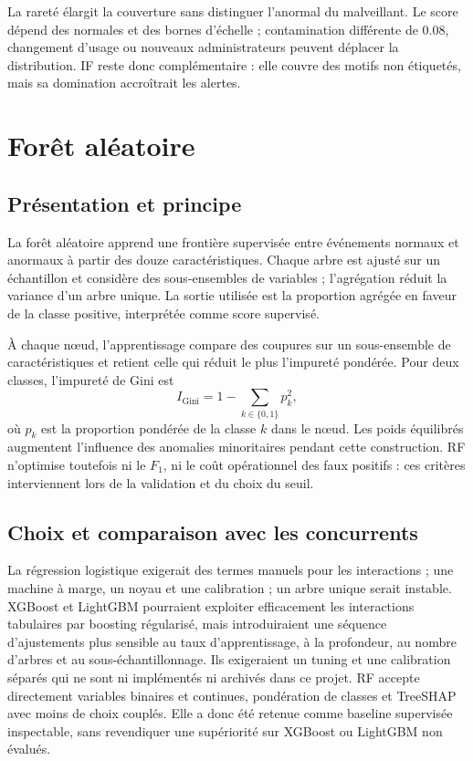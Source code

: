 \documentclass[11pt,a4paper,oneside]{report}
\theoremstyle{definition}
\theoremstyle{plain}
\begin{document}
La rareté élargit la couverture sans distinguer l'anormal du malveillant. Le score dépend des normales et des bornes d'échelle ; contamination différente de $0.08$, changement d'usage ou nouveaux administrateurs peuvent déplacer la distribution. IF reste donc complémentaire : elle couvre des motifs non étiquetés, mais sa domination accroîtrait les alertes.

\section{Forêt aléatoire}
\label{sec:ai-ro-rf}

\subsection*{Présentation et principe}

La forêt aléatoire apprend une frontière supervisée entre événements normaux et anormaux à partir des douze caractéristiques. Chaque arbre est ajusté sur un échantillon et considère des sous-ensembles de variables ; l'agrégation réduit la variance d'un arbre unique. La sortie utilisée est la proportion agrégée en faveur de la classe positive, interprétée comme score supervisé.

À chaque nœud, l'apprentissage compare des coupures sur un sous-ensemble de
caractéristiques et retient celle qui réduit le plus l'impureté pondérée. Pour
deux classes, l'impureté de Gini est
\[
I_{\mathrm{Gini}}=1-\sum_{k\in\{0,1\}}p_k^2,
\]
où $p_k$ est la proportion pondérée de la classe $k$ dans le nœud. Les poids
équilibrés augmentent l'influence des anomalies minoritaires pendant cette
construction. RF n'optimise toutefois ni le $F_1$, ni le coût opérationnel des
faux positifs : ces critères interviennent lors de la validation et du choix
du seuil.

\subsection*{Choix et comparaison avec les concurrents}

La régression logistique exigerait des termes manuels pour les interactions ;
une machine à marge, un noyau et une calibration ; un arbre unique serait
instable. XGBoost et LightGBM pourraient exploiter efficacement les
interactions tabulaires par boosting régularisé, mais introduiraient une
séquence d'ajustements plus sensible au taux d'apprentissage, à la profondeur,
au nombre d'arbres et au sous-échantillonnage. Ils exigeraient un tuning et une
calibration séparés qui ne sont ni implémentés ni archivés dans ce projet. RF
accepte directement variables binaires et continues, pondération de classes et
TreeSHAP avec moins de choix couplés. Elle a donc été retenue comme baseline
supervisée inspectable, sans revendiquer une supériorité sur XGBoost ou
LightGBM non évalués.
\end{document}
